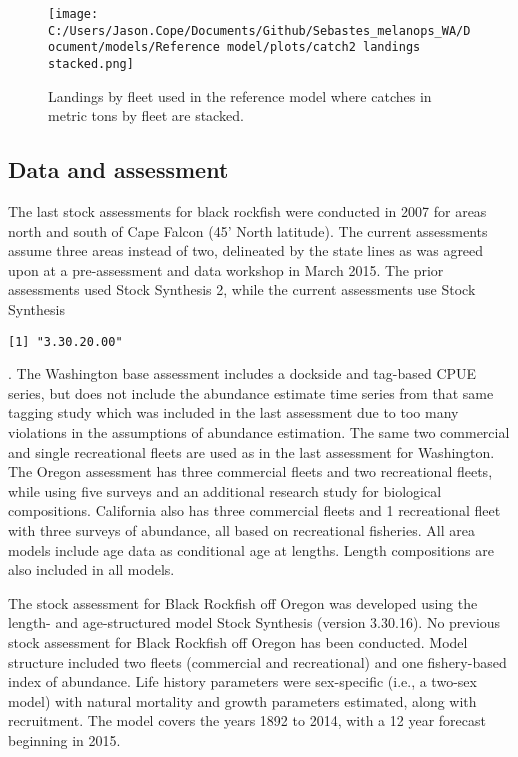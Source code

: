 \documentclass[11pt,
  english,
  letterpaper,
]{article}
\begin{document}


\begin{figure}
\centering
\texttt{[image: C:/Users/Jason.Cope/Documents/Github/Sebastes\_melanops\_WA/Document/models/Reference model/plots/catch2 landings stacked.png]}
\caption{Landings by fleet used in the reference model where catches in metric tons by fleet are stacked.\label{fig:es-catch}}
\end{figure}

\clearpage

\hypertarget{data-and-assessment}{%
\subsection*{Data and assessment}\label{data-and-assessment}}

The last stock assessments for black rockfish were conducted in 2007 for areas north and south of Cape Falcon (45' North latitude). The current assessments assume three areas instead of two, delineated by the state lines as was agreed upon at a pre-assessment and data workshop in March 2015. The prior assessments used Stock Synthesis 2, while the current assessments use Stock Synthesis

\begin{verbatim}
[1] "3.30.20.00"
\end{verbatim}

. The Washington base assessment includes a dockside and tag-based CPUE series, but does not include the abundance estimate time series from that same tagging study which was included in the last assessment due to too many violations in the assumptions of abundance estimation. The same two commercial and single recreational fleets are used as in the last assessment for Washington. The Oregon assessment has three commercial fleets and two recreational fleets, while using five surveys and an additional research study for biological compositions. California also has three commercial fleets and 1 recreational fleet with three surveys of abundance, all based on recreational fisheries. All area models include age data as conditional age at lengths. Length compositions are also included in all models.

The stock assessment for Black Rockfish off Oregon was developed using the length- and age-structured model Stock Synthesis (version 3.30.16). No previous stock assessment for Black Rockfish off Oregon has been conducted. Model structure included two fleets (commercial and recreational) and one fishery-based index of abundance. Life history parameters were sex-specific (i.e., a two-sex model) with natural mortality and growth parameters estimated, along with recruitment. The model covers the years 1892 to 2014, with a 12 year forecast beginning in 2015.
\end{document}
